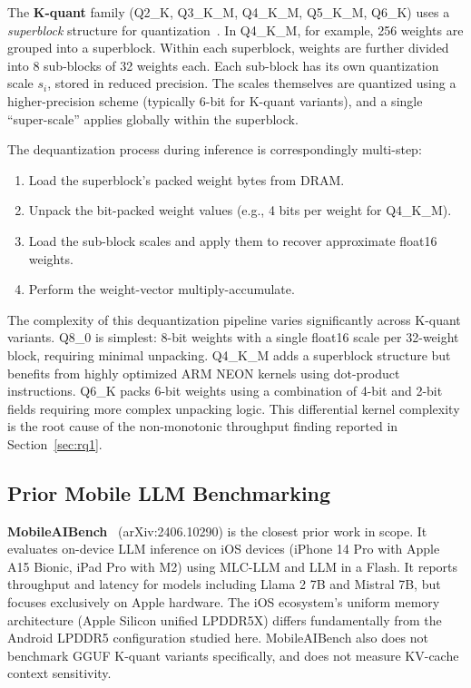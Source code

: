 \documentclass[conference]{IEEEtran}
\begin{document}
The \textbf{K-quant} family (Q2\_K, Q3\_K\_M, Q4\_K\_M, Q5\_K\_M, Q6\_K)
uses a \emph{superblock} structure for quantization~\cite{gguf}. In Q4\_K\_M,
for example, 256 weights are grouped into a superblock. Within each superblock,
weights are further divided into 8 sub-blocks of 32 weights each. Each sub-block
has its own quantization scale $s_i$, stored in reduced precision. The scales
themselves are quantized using a higher-precision scheme (typically 6-bit for
K-quant variants), and a single ``super-scale'' applies globally within the
superblock.

The dequantization process during inference is correspondingly multi-step:
\begin{enumerate}
  \item Load the superblock's packed weight bytes from DRAM.
  \item Unpack the bit-packed weight values (e.g., 4 bits per weight for Q4\_K\_M).
  \item Load the sub-block scales and apply them to recover approximate float16 weights.
  \item Perform the weight-vector multiply-accumulate.
\end{enumerate}

The complexity of this dequantization pipeline varies significantly across
K-quant variants. Q8\_0 is simplest: 8-bit weights with a single float16 scale
per 32-weight block, requiring minimal unpacking. Q4\_K\_M adds a superblock
structure but benefits from highly optimized ARM NEON kernels using dot-product
instructions. Q6\_K packs 6-bit weights using a combination of 4-bit and 2-bit
fields requiring more complex unpacking logic. This differential kernel complexity
is the root cause of the non-monotonic throughput finding reported in
Section~\ref{sec:rq1}.

\subsection{Prior Mobile LLM Benchmarking}

\textbf{MobileAIBench}~\cite{mobileaibench} (arXiv:2406.10290) is the closest
prior work in scope. It evaluates on-device LLM inference on iOS devices (iPhone
14 Pro with Apple A15 Bionic, iPad Pro with M2) using MLC-LLM and LLM in a Flash.
It reports throughput and latency for models including Llama 2 7B and Mistral 7B,
but focuses exclusively on Apple hardware. The iOS ecosystem's uniform memory
architecture (Apple Silicon unified LPDDR5X) differs fundamentally from the
Android LPDDR5 configuration studied here. MobileAIBench also does not benchmark
GGUF K-quant variants specifically, and does not measure KV-cache context
sensitivity.
\end{document}
